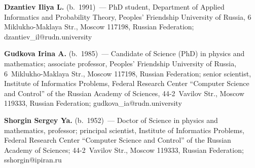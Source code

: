\vspace*{5pt}

\noindent
\textbf{Dzantiev Iliya L.} (b.\ 1991)~--- PhD student, Department of Applied Informatics and 
Probability Theory, Peoples' Friendship University of Russia, 6 Miklukho-Maklaya Str., Moscow 
117198, Russian Federation; \mbox{dzantiev\_il@rudn.university}

\vspace*{5pt}

\noindent
\textbf{Gudkova Irina A.} (b.\ 1985)~--- Candidate of Science (PhD) in physics and 
mathematics; associate professor, 
Peoples' Friendship University of Russia, 6~Miklukho-Maklaya 
Str., Moscow 117198, Russian Federation; senior scientist, Institute of Informatics Problems, 
Federal Research Center ``Computer Science and Control'' of the Russian Academy of Sciences, 
44-2~Vavilov Str., Moscow 119333, Russian Federation; \mbox{gudkova\_ia@rudn.university}

\vspace*{5pt}

\noindent
\textbf{Shorgin Sergey Ya.} (b.\ 1952)~--- Doctor of Science in physics and mathematics, 
professor; principal scientist, Institute of Informatics Problems, Federal Research Center 
``Computer Science and Control'' of the Russian Academy of Sciences; 44-2~Vavilov Str., Moscow 
119333, Russian Federation; \mbox{sshorgin@ipiran.ru}


\label{end\stat}

\renewcommand{\bibname}{\protect\rm Литература}       